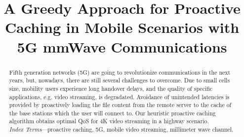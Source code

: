 \documentclass[conference,10pt]{IEEEtran}
\begin{document}
\title{A Greedy Approach for Proactive	Caching	in	Mobile	Scenarios	with 5G mmWave	Communications}

\author{
}

\maketitle


\begin{abstract}
Fifth generation networks (5G) are going to revolutionize communications in the next years, but, nowadays, there are still several challenges to overcome. Due to small cells size, mobility users experience long handover delays, and the quality of specific applications, e.g. video streaming, is degradated. Avoidance of unintended latencies is provided by proactively loading the file content from the remote server to the cache of the base stations which the user will connect to. Our heuristic proactive caching algorithm obtains optimal QoS for 4K video streaming in a highway scenario.\\

\textit{Index Terms}---proactive caching, 5G, mobile video streaming, millimeter wave channel.
\end{abstract}




\end{document}
